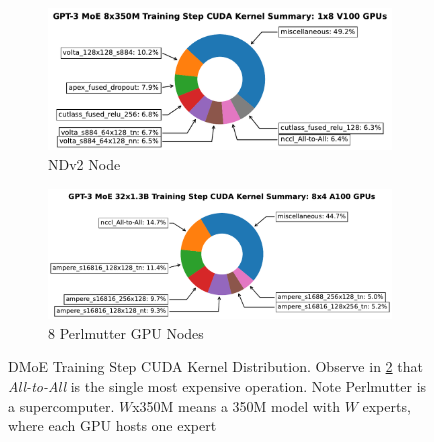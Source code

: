 \begin{figure}[!h]
    \begin{subfigure}{.5\linewidth}
        \centering
        \includegraphics[width=\linewidth]{images/single_trace_1x8_donut}
        \caption{NDv2 Node}
        \label{singlepie}
    \end{subfigure}\hfill %
    \begin{subfigure}{.5\linewidth}
        \centering
        \includegraphics[width=\linewidth]{images/multi_sum_8x4_1.3B_donut}
        \caption{8 Perlmutter GPU Nodes}
        \label{multi_1.3B_pie}
    \end{subfigure}
    \caption{\footnotesize DMoE Training Step CUDA Kernel Distribution.
    Observe in \ref{multi_1.3B_pie} that \emph{All-to-All} is the single most expensive operation.
    Note Perlmutter is a supercomputer. $W$x350M means a 350M model with $W$ experts, where each GPU hosts one expert}
    \label{fig:donut}
\end{figure}

